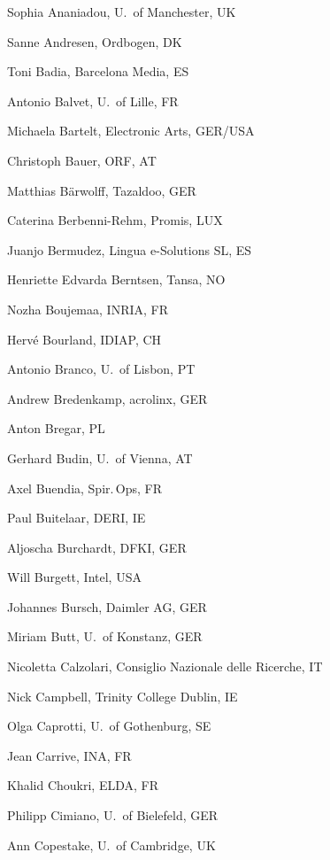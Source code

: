 \documentclass[10pt, plain]{../../metanetpaper}
\begin{document}
\begin{multicols}{3}
\begin{footnotesize}
  \begin{enumerate}
    \raggedright{
      \item Sophia Ananiadou, U.~of Manchester, UK
      \item Sanne Andresen, Ordbogen, DK
      \item Toni Badia, Barcelona Media, ES
      \item Antonio Balvet, U.~of Lille, FR
      \item Michaela Bartelt, Electronic Arts, GER/USA
      \item Christoph Bauer, ORF, AT
      \item Matthias Bärwolff, Tazaldoo, GER
      \item Caterina Berbenni-Rehm, Promis, LUX
      \item Juanjo Bermudez, Lingua e-Solutions SL, ES
      \item Henriette Edvarda Berntsen, Tansa, NO
      \item Nozha Boujemaa, INRIA, FR
      \item Hervé Bourland, IDIAP, CH
      \item Antonio Branco, U.~of Lisbon, PT
      \item Andrew Bredenkamp, acrolinx, GER
      \item Anton Bregar, PL
      \item Gerhard Budin, U.~of Vienna, AT
      \item Axel Buendia, Spir.\,Ops, FR
      \item Paul Buitelaar, DERI, IE
      \item Aljoscha Burchardt, DFKI, GER
      \item Will Burgett, Intel, USA
      \item Johannes Bursch, Daimler AG, GER
      \item Miriam Butt, U.~of Konstanz, GER
      \item Nicoletta Calzolari, Consiglio Nazionale delle Ricerche, IT
      \item Nick Campbell, Trinity College Dublin, IE
      \item Olga Caprotti, U.~of Gothenburg, SE
      \item Jean Carrive, INA, FR
      \item Khalid Choukri, ELDA, FR
      \item Philipp Cimiano, U.~of Bielefeld, GER
      \item Ann Copestake, U.~of Cambridge, UK
}
\end{enumerate}
\end{footnotesize}
\end{multicols}
\end{document}
